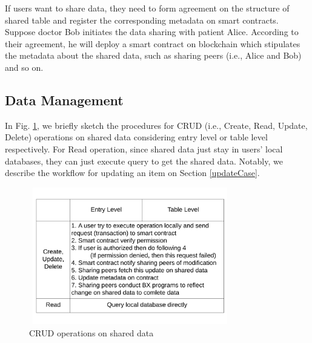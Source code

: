 \documentclass[conference]{IEEEtran}
\begin{document}
If users want to share data, they need to form agreement on the structure of shared table and register the corresponding metadata on smart contracts. Suppose doctor Bob initiates the data sharing with patient Alice. According to their agreement, he will deploy a smart contract on blockchain which stipulates the metadata about the shared data, such as sharing peers (i.e., Alice and Bob) and so on. 


%

\subsection{Data Management}
In Fig. \ref{data manage}, we briefly sketch the procedures for CRUD  (i.e., Create, Read, Update, Delete) operations on shared data considering entry level or table level respectively. For Read operation, since shared data just stay in users' local databases, they can just execute query to get the shared data. Notably, we describe the workflow for updating an item on Section \ref{updateCase}.

\begin{figure}[htbp]
	\centerline{\includegraphics[width=250pt,height=170pt]{dataManage.pdf}}
	\caption{CRUD operations on shared data}
	\label{data manage}
\end{figure}
\end{document}
